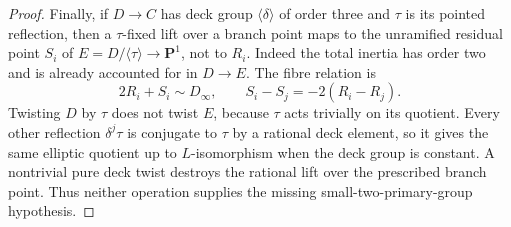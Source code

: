 \documentclass[11pt]{article}
\begin{document}
\begin{proof}
Finally, if \(D\to C\) has deck group \(\langle\delta\rangle\)
of order three and \(\tau\) is its pointed reflection,
then a \(\tau\)-fixed lift over a branch point maps to the
unramified residual point \(S_i\) of
\(E=D/\langle\tau\rangle\to\mathbf P^1\), not to \(R_i\).
Indeed the total inertia has order two and is already
accounted for in \(D\to E\). The fibre relation is
\[
                     2R_i+S_i\sim D_\infty,\qquad
                     S_i-S_j=-2(R_i-R_j).
\]
Twisting \(D\) by \(\tau\) does not twist \(E\), because
\(\tau\) acts trivially on its quotient. Every other reflection
\(\delta^j\tau\) is conjugate to \(\tau\) by a rational deck
element, so it gives the same elliptic quotient up to
\(L\)-isomorphism when the deck group is constant.
A nontrivial pure deck twist destroys the rational lift over
the prescribed branch point. Thus neither operation supplies
the missing small-two-primary-group hypothesis.
\end{proof}
\end{document}
